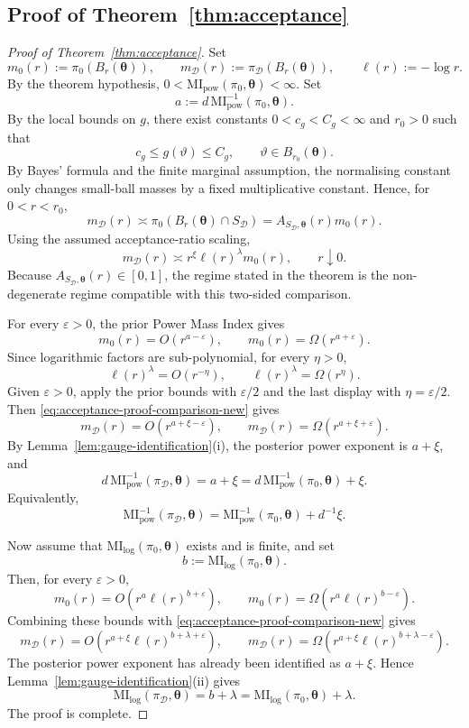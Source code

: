 \documentclass[11pt,a4paper]{article}
\newcommand{\MI}{\mathrm{MI}}
\newcommand{\pa}{\boldsymbol\theta}
\theoremstyle{compactplain}
\theoremstyle{compactdefinition}
\numberwithin{equation}{section}
\begin{document}
\subsection*{Proof of Theorem~\ref{thm:acceptance}}
\begin{proof}[Proof of Theorem~\ref{thm:acceptance}]
Set
\[
 m_0(r):=\pi_0(B_r(\pa)),
 \qquad
 m_{\mathcal D}(r):=\pi_{\mathcal D}(B_r(\pa)),
 \qquad
 \ell(r):=-\log r .
\]
By the theorem hypothesis, \(0<\MI_{\mathrm{pow}}(\pi_0,\pa)<\infty\). Set
\[
 a:=d\,\MI_{\mathrm{pow}}^{-1}(\pi_0,\pa).
\]
By the local bounds on \(g\), there exist constants
\(0<c_g<C_g<\infty\) and \(r_0>0\) such that
\[
 c_g\le g(\vartheta)\le C_g,
 \qquad \vartheta\in B_{r_0}(\pa).
\]
By Bayes' formula and the finite marginal assumption, the normalising constant
only changes small-ball masses by a fixed multiplicative constant. Hence, for
\(0<r<r_0\),
\[
 m_{\mathcal D}(r)
 \asymp
 \pi_0(B_r(\pa)\cap S_{\mathcal D})
 =A_{S_{\mathcal D},\pa}(r)m_0(r).
\]
Using the assumed acceptance-ratio scaling,
\begin{equation}\label{eq:acceptance-proof-comparison-new}
 m_{\mathcal D}(r)
 \asymp
 r^\xi\ell(r)^\lambda m_0(r),
 \qquad r\downarrow0 .
\end{equation}
Because \(A_{S_{\mathcal D},\pa}(r)\in[0,1]\), the regime stated in the theorem is the
non-degenerate regime compatible with this two-sided comparison.

For every \(\varepsilon>0\), the prior Power Mass Index gives
\[
 m_0(r)=O(r^{a-\varepsilon}),
 \qquad
 m_0(r)=\Omega(r^{a+\varepsilon}).
\]
Since logarithmic factors are sub-polynomial, for every \(\eta>0\),
\[
 \ell(r)^\lambda=O(r^{-\eta}),
 \qquad
 \ell(r)^\lambda=\Omega(r^{\eta}) .
\]
Given \(\varepsilon>0\), apply the prior bounds with \(\varepsilon/2\) and the
last display with \(\eta=\varepsilon/2\). Then
\eqref{eq:acceptance-proof-comparison-new} gives
\[
 m_{\mathcal D}(r)=O(r^{a+\xi-\varepsilon}),
 \qquad
 m_{\mathcal D}(r)=\Omega(r^{a+\xi+\varepsilon}).
\]
By Lemma~\ref{lem:gauge-identification}\textnormal{(i)}, the posterior power
exponent is \(a+\xi\), and
\[
 d\,\MI_{\mathrm{pow}}^{-1}(\pi_{\mathcal D},\pa)
 =a+\xi
 =d\,\MI_{\mathrm{pow}}^{-1}(\pi_0,\pa)+\xi .
\]
Equivalently,
\[
 \MI_{\mathrm{pow}}^{-1}(\pi_{\mathcal D},\pa)
 =\MI_{\mathrm{pow}}^{-1}(\pi_0,\pa)+d^{-1}\xi .
\]

Now assume that \(\MI_{\mathrm{log}}(\pi_0,\pa)\) exists and is finite, and set
\[
 b:=\MI_{\mathrm{log}}(\pi_0,\pa).
\]
Then, for every \(\varepsilon>0\),
\[
 m_0(r)=O\!\left(r^a\ell(r)^{b+\varepsilon}\right),
 \qquad
 m_0(r)=\Omega\!\left(r^a\ell(r)^{b-\varepsilon}\right).
\]
Combining these bounds with \eqref{eq:acceptance-proof-comparison-new} gives
\[
 m_{\mathcal D}(r)
 =O\!\left(r^{a+\xi}\ell(r)^{b+\lambda+\varepsilon}\right),
 \qquad
 m_{\mathcal D}(r)
 =\Omega\!\left(r^{a+\xi}\ell(r)^{b+\lambda-\varepsilon}\right).
\]
The posterior power exponent has already been identified as \(a+\xi\). Hence
Lemma~\ref{lem:gauge-identification}\textnormal{(ii)} gives
\[
 \MI_{\mathrm{log}}(\pi_{\mathcal D},\pa)
 =b+\lambda
 =\MI_{\mathrm{log}}(\pi_0,\pa)+\lambda .
\]
The proof is complete.
\end{proof}
\end{document}
